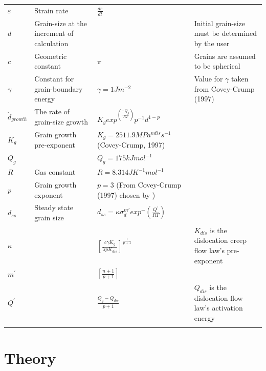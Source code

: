 \documentclass[]{scrreprt}
\begin{document}
\begin{table}
\begin{tabular}{| L{1.3cm} | C{3.95cm} | C{5.25cm} | C{4.95cm} |}
$\dot{\varepsilon}$ & {\small Strain rate} & $\frac{d\varepsilon}{dt}$ &  \\

$d$ & {\small Grain-size at the increment of calculation} &  & {\small Initial grain-size must be determined by the user} \\
$c$ & {\small Geometric constant} & $\pi$ & {\small Grains are assumed to be spherical \citep{Austin2009}} \\

$\gamma$ & {\small Constant for grain-boundary energy} & $\gamma = 1 Jm^{-2}$ & {\small Value for $\gamma$ taken from Covey-Crump (1997)} \\

$\dot{d}_{growth}$ & {\small The rate of grain-size growth} & $K_g exp^{\left(\frac{-Q_g}{RT}\right)} p^{-1} d^{1-p}$ &  \\

$K_g$ & {\small Grain growth pre-exponent} & $K_g = 2511.9 MPa^{ndis}s^{-1}$ {\footnotesize (Covey-Crump, 1997)} & \\

$Q_g$ &  & $Q_g = 175 kJ mol^{-1}$ {\footnotesize {}} &  \\

$R$ & {\small Gas constant} & $R = 8.314 JK^{-1}mol^{-1}$  &  \\

$p$ & {\small Grain growth exponent} & $p = 3$ {\footnotesize (From Covey-Crump (1997) chosen by \citet{Herwegh2014})} &  \\

$d_{ss}$ & Steady state grain size & $d_{ss} = \kappa \sigma_{d}^{m'} exp^-{\left(\frac{Q^{'}}{RT}\right)}$  &  \\

$\kappa$ &  & $\left[\frac{c \gamma K_g}{\lambda p K_{dis}}\right]^{\frac{1}{p+1}}$ & {\small 

$K_{dis}$ is the dislocation creep flow law's pre-exponent} \\

$m^{'}$ &  & $\left[\frac{n+1}{p+1}\right]$ &  \\

$Q^{'}$ &  & $\frac{Q_g-Q_{dis}}{p+1}$ & {\small $Q_{dis}$ is the dislocation flow law's activation energy} \\
\noalign{\smallskip}\hline
\end{tabular}
\end{table}

\section{Theory}
\label{section:theory_size_sensitivity}
\end{document}
